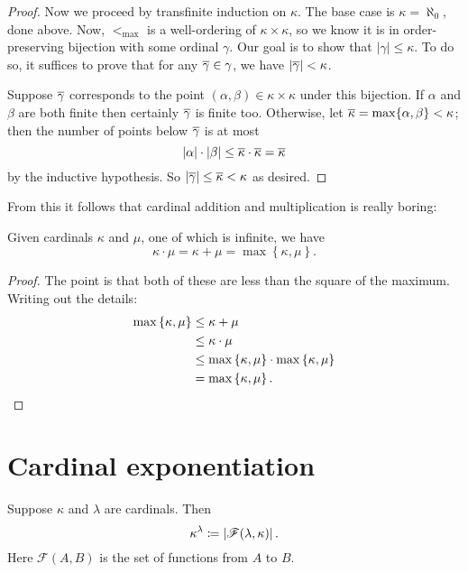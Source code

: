 \begin{proof}
	Now we proceed by transfinite induction on $\kappa$.
	The base case is $\kappa = \aleph_0$, done above.
	Now, $<_{\text{max}}$ is a well-ordering of $\kappa \times \kappa$,
	so we know it is in order-preserving bijection with some ordinal $\gamma$.
	Our goal is to show that $\left\lvert \gamma \right\rvert \le \kappa$.
	To do so, it suffices to prove that for any $\overline\gamma \in \gamma$,
	we have $\left\lvert \overline\gamma \right\rvert < \kappa$.

	Suppose $\overline\gamma$ corresponds to the point $(\alpha, \beta) \in \kappa \times \kappa$
	under this bijection.
	If $\alpha$ and $\beta$ are both finite
	then certainly $\overline\gamma$ is finite too.
	Otherwise, let $\overline\kappa = \max \{\alpha, \beta\} < \kappa$;
	then the number of points below $\overline\gamma$ is at most
	\[
		\left\lvert \alpha \right\rvert \cdot \left\lvert \beta \right\rvert
		\le \overline\kappa \cdot \overline\kappa
		= \overline\kappa
	\]
	by the inductive hypothesis.
	So $\left\lvert \overline\gamma \right\rvert \le \overline\kappa < \kappa$ as desired.
\end{proof}

From this it follows that cardinal addition and multiplication is really boring:
\begin{theorem}
	Given cardinals $\kappa$ and $\mu$,
	one of which is infinite, we have
	\[ \kappa \cdot \mu = \kappa + \mu
	= \max\left\{ \kappa, \mu \right\}.\]
\end{theorem}
\begin{proof}
	The point is that both of these are less than the square of the maximum.
	Writing out the details:
	\begin{align*}
		\max \left\{ \kappa, \mu \right\}
		&\le \kappa + \mu \\
		&\le \kappa \cdot \mu \\
		&\le \max \left\{ \kappa, \mu \right\}
			\cdot \max \left\{ \kappa, \mu  \right\} \\
		&= \max\left\{ \kappa, \mu \right\}. \qedhere
	\end{align*}
\end{proof}




\section{Cardinal exponentiation}
\begin{definition}
	Suppose $\kappa$ and $\lambda$ are cardinals.
	Then
	\[ \kappa^\lambda
		\coloneqq \left\lvert \mathscr F(\lambda, \kappa) \right\rvert.
	\]
	Here $\mathscr F(A,B)$ is the set of functions from $A$ to $B$.
\end{definition}

